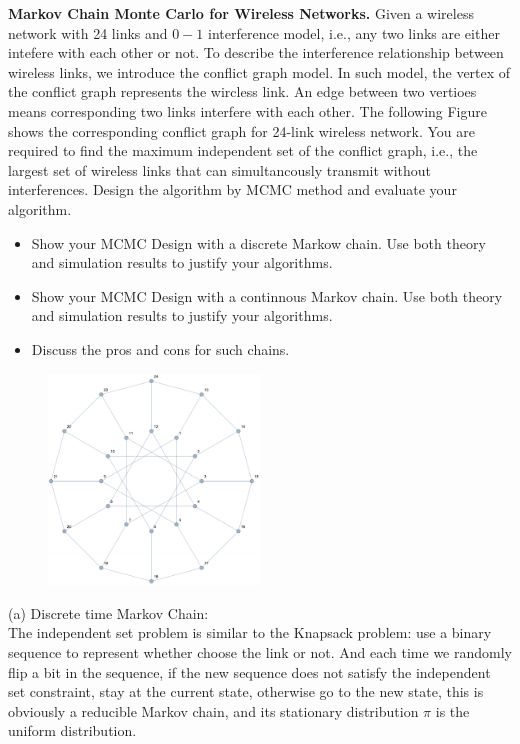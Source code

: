 \begin{homeworkProblem}

\textbf{Markov Chain Monte Carlo for Wireless Networks.} Given a wireless network with 24 links and $0-1$ interference model, i.e., any two links are either intefere with each other or not. To describe the interference relationship between wireless links, we introduce the conflict graph model. In such model, the vertex of the conflict graph represents the wircless link. An edge between two vertioes means corresponding two links interfere with each other. The following Figure shows the corresponding conflict graph for 24-link wireless network. You are required to find the maximum independent set of the conflict graph, i.e., the largest set of wireless links that can simultancously transmit without interferences. Design the algorithm by MCMC method and evaluate your algorithm.
\begin{itemize}
\item Show your MCMC Design with a discrete Markow chain. Use both theory and simulation results to justify your algorithms.
\item Show your MCMC Design with a continnous Markov chain. Use both theory and simulation results to justify your algorithms.
\item Discuss the pros and cons for such chains.
\end{itemize}

\begin{figure}[h]
    \centering
    \includegraphics[width=0.5\textwidth]{./figure/p14/graph.png}
\end{figure}

\solution

(a) Discrete time Markov Chain: \\
The independent set problem is similar to the Knapsack problem: use a binary sequence to represent whether choose the link or not. And each time we randomly flip a bit in the sequence, if the new sequence does not satisfy the independent set constraint, stay at the current state, otherwise go to the new state, this is obviously a reducible Markov chain, and its stationary distribution $\pi$ is the uniform distribution.


\end{homeworkProblem}
